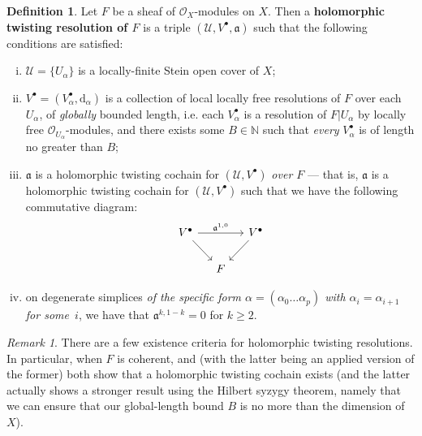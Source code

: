 \documentclass[11pt,fleqn]{article}
\theoremstyle{plain}
\theoremstyle{definition}
\newtheorem{definition}[theorem]{Definition}
\theoremstyle{remark}
\newtheorem{remark}[theorem]{Remark}
\numberwithin{equation}{theorem}
\newcommand{\cover}{\mathcal{U}}
\newcommand{\OO}{\mathcal{O}}
\newcommand{\restricted}{\mathbin{\big\vert}}
\newcommand{\twc}{\mathfrak{a}}
\newcommand{\define}[1]{\textbf{#1}}
\renewcommand{\d}{\mathrm{d}}
\begin{document}
        \begin{definition}\label{definition:holomorphic-twisted-resolution}
            Let $F$ be a sheaf of $\OO_X$-modules on $X$.
            Then a \define{holomorphic twisting resolution of $F$} is a triple $(\cover,V^\bullet,\twc)$ such that the following conditions are satisfied:
            \begin{enumerate}[(i)]
                \item $\cover=\{U_\alpha\}$ is a locally-finite Stein open cover of $X$;
                \item $V^\bullet=(V^\bullet_\alpha,\d_\alpha)$ is a collection of local locally free resolutions of $F$ over each $U_\alpha$, of \emph{globally} bounded length, i.e. each $V^\bullet_\alpha$ is a resolution of $F\restricted {U_\alpha}$ by locally free $\OO_{U_\alpha}$-modules, and there exists some $B\in\mathbb{N}$ such that \emph{every} $V^\bullet_\alpha$ is of length no greater than $B$;
                \item $\twc$ is a holomorphic twisting cochain for $(\cover,V^\bullet)$ \textit{over $F$} --- that is, $\twc$ is a holomorphic twisting cochain for $(\cover,V^\bullet)$ such that we have the following commutative diagram:
                    \begin{equation*}
                        \begin{tikzcd}[column sep=small]
                            V^\bullet
                                \ar{rr}{\twc^{1,0}}
                                \ar{dr}
                        &&  V^\bullet
                                \ar{dl}
                        \\& F
                        \end{tikzcd}
                    \end{equation*}
                \item on degenerate simplices \emph{of the specific form $\alpha=(\alpha_0\ldots\alpha_p)$ with $\alpha_i=\alpha_{i+1}$ for some~$i$}, we have that $\twc^{k,1-k}=0$ for $k\geqslant2$.
            \end{enumerate}
        \end{definition}

        \begin{remark}
            There are a few existence criteria for holomorphic twisting resolutions.
            In particular, when $F$ is coherent, \cite[Lemma~8.13]{Toledo&Tong1976} and \cite[Lemma~2.4]{Toledo&Tong1978} (with the latter being an applied version of the former) both show that a holomorphic twisting cochain exists (and the latter actually shows a stronger result using the Hilbert syzygy theorem, namely that we can ensure that our global-length bound $B$ is no more than the dimension of $X$).
        \end{remark}
\end{document}
